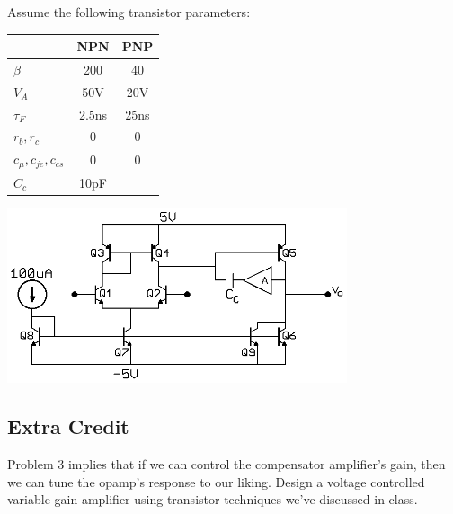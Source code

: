 \documentclass[11pt,twoside]{article}
\begin{document}
\begin{center}
Assume the following transistor parameters: \\
\begin{tabular}{| l | c | c |}
\hline
 & NPN & PNP \\
\hline
\hline
$\beta$	& 200 & 40 \\
\hline
$V_A$	& 50V & 20V \\
\hline
$\tau_F$ & 2.5ns & 25ns \\
\hline
$r_b,r_c$ & 0 & 0 \\
\hline
$c_\mu, c_{je}, c_{cs}$ & 0 & 0 \\
\hline
\hline
$C_c$ & 10pF & \\
\hline
\end{tabular}
\end{center}

\begin{center}
\includegraphics[width=0.75\textwidth]{comp-op.png}
\end{center}

\subsection*{Extra Credit}
Problem 3 implies that if we can control the compensator amplifier's gain, then we can tune the opamp's response to our liking.  Design a voltage controlled variable gain amplifier using transistor techniques we've discussed in class.
\end{document}
